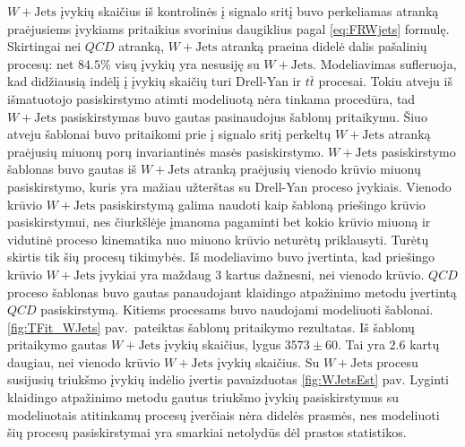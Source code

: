 \documentclass[a4paper, 12pt, oneside]{article}
\newcommand{\ttbar}{t\bar{t}}
\newcommand{\WJets}{W\! +\!\mathrm{Jets}}
\newcommand{\QCD}{QC\! D}
\newlength\q
\begin{document}
$\WJets$ įvykių skaičius iš kontrolinės į signalo sritį buvo perkeliamas atranką praėjusiems įvykiams pritaikius svorinius
daugiklius pagal \ref{eq:FRWjets} formulę.
Skirtingai nei $\QCD$ atranką, $\WJets$ atranką praeina didelė dalis pašalinių procesų: net $84.5\%$ visų įvykių yra
nesusiję su $\WJets$.
Modeliavimas sufleruoja, kad didžiausią indėlį į įvykių skaičių turi Drell-Yan ir $\ttbar$ procesai.
Tokiu atveju iš išmatuotojo pasiskirstymo atimti modeliuotą nėra tinkama procedūra, tad $\WJets$ pasiskirstymas buvo
gautas pasinaudojus šablonų pritaikymu.
Šiuo atveju šablonai buvo pritaikomi prie į signalo sritį perkeltų $\WJets$ atranką praėjusių miuonų porų invariantinės
masės pasiskirstymo.
$\WJets$ pasiskirstymo šablonas buvo gautas iš $\WJets$ atranką praėjusių vienodo krūvio miuonų pasiskirstymo,
kuris yra mažiau užterštas su Drell-Yan proceso įvykiais.
Vienodo krūvio $\WJets$ pasiskirstymą galima naudoti kaip šabloną priešingo krūvio pasiskirstymui, nes čiurkšlėje įmanoma pagaminti
bet kokio krūvio miuoną ir vidutinė proceso kinematika nuo miuono krūvio neturėtų priklausyti.
Turėtų skirtis tik šių procesų tikimybės.
Iš modeliavimo buvo įvertinta, kad priešingo krūvio $\WJets$ įvykiai yra maždaug 3 kartus dažnesni, nei vienodo krūvio.
$\QCD$ proceso šablonas buvo gautas panaudojant klaidingo atpažinimo metodu įvertintą $\QCD$ pasiskirstymą.
Kitiems procesams buvo naudojami modeliuoti šablonai.
\ref{fig:TFit_WJets} pav.\ pateiktas šablonų pritaikymo rezultatas.
Iš šablonų pritaikymo gautas $\WJets$ įvykių skaičius, lygus $3573 \pm 60$.
Tai yra $2.6$ kartų daugiau, nei vienodo krūvio $\WJets$ įvykių skaičius.
Su $\WJets$ procesu susijusių triukšmo įvykių indėlio įvertis pavaizduotas \ref{fig:WJetsEst} pav.
Lyginti klaidingo atpažinimo metodu gautus triukšmo įvykių pasiskirstymus su modeliuotais atitinkamų procesų įverčiais
nėra didelės prasmės, nes modeliuoti šių procesų pasiskirstymai yra smarkiai netolydūs dėl prastos statistikos.

\vspace{1cm}
\end{document}
